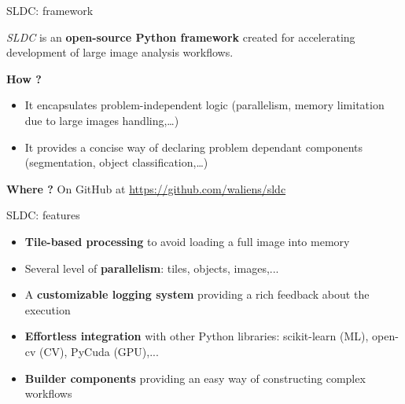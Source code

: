 \documentclass{beamer}
\begin{document}
\begin{frame}{SLDC: framework}

	\textit{SLDC} is an \textbf{open-source Python framework} created for accelerating development of large image analysis workflows. 
	
	\vfill

	\textbf{How ?}
	\begin{itemize}

		\item It encapsulates problem-independent logic (parallelism, memory limitation due to large images handling,…)

		\item It provides a concise way of declaring problem dependant components (segmentation, object classification,…)

	\end{itemize}
	
	\vfill
	
	\textbf{Where ?}
	On GitHub at {\small\url{https://github.com/waliens/sldc}}

\end{frame}


\begin{frame}{SLDC: features}
	\begin{itemize}
	
		\item \textbf{Tile-based processing} to avoid loading a full image into memory
		
		\item Several level of \textbf{parallelism}: tiles, objects, images,...
		
		\item A \textbf{customizable logging system} providing a rich feedback about the execution
		
		\item \textbf{Effortless integration} with other Python libraries: scikit-learn (ML), open-cv (CV), PyCuda (GPU),...
		
		\item \textbf{Builder components} providing an easy way of constructing complex workflows
		
	\end{itemize}
\end{frame}
\end{document}
